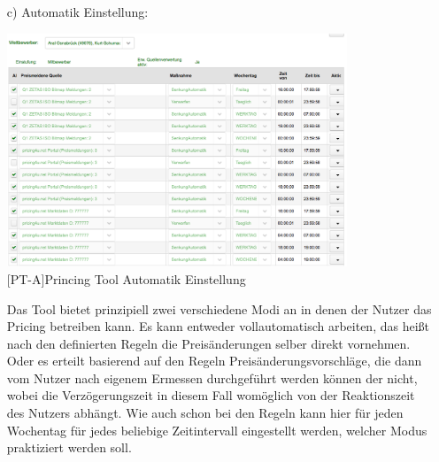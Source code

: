 \documentclass[12pt,a4paper,bibliography=totocnumbered,listof=totocnumbered]{scrartcl}
\begin{document}
\begin{enumerate}
\item[c)] Automatik Einstellung:\\
\begin{center}
	\includegraphics[width=0.8\textwidth, draft]{Bilder/automatik.png}\\
	[PT-A]{Princing Tool Automatik Einstellung}
	\label{fig:PT-A}
\end{center}
Das Tool bietet prinzipiell zwei verschiedene Modi an in denen der Nutzer das Pricing betreiben kann. Es kann entweder vollautomatisch arbeiten, das heißt nach den definierten Regeln die Preisänderungen selber direkt vornehmen. Oder es erteilt basierend auf den Regeln Preisänderungsvorschläge, die dann vom Nutzer nach eigenem Ermessen durchgeführt werden können der nicht, wobei die Verzögerungszeit in diesem Fall womöglich von der Reaktionszeit des Nutzers abhängt. Wie auch schon bei den Regeln kann hier für jeden Wochentag für jedes beliebige Zeitintervall eingestellt werden, welcher Modus praktiziert werden soll.
\end{enumerate}




\end{document}
